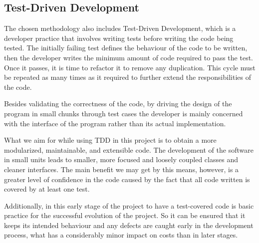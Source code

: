 \subsection{Test-Driven Development}

The chosen methodology also includes Test-Driven Development, which is a developer practice that involves writing tests before writing the code being tested. The initially failing test defines the behaviour of the code to be written, then the developer writes the minimum amount of code required to pass the test. Once it passes, it is time to refactor it to remove any duplication. This cycle must be repeated as many times as it required to further extend the responsibilities of the code.

Besides validating the correctness of the code, by driving the design of the program in small chunks through test cases the developer is mainly concerned with the interface of the program rather than its actual implementation.

What we aim for while using TDD in this project is to obtain a more modularized, maintainable, and extensible code. The development of the software in small units leads to smaller, more focused and loosely coupled classes and cleaner interfaces. The main benefit we may get by this means, however, is a greater level of confidence in the code caused by the fact that all code written is covered by at least one test.

Additionally, in this early stage of the project to have a test-covered code is basic practice for the successful evolution of the project. So it can be ensured that it keeps its intended behaviour and any defects are caught early in the development process, what has a considerably minor impact on costs than in later stages.
